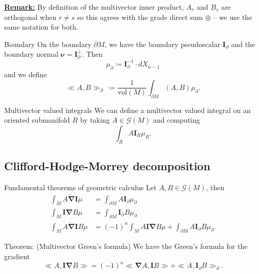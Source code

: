 \documentclass[aspectratio=169,handout]{beamer}
\newcommand{\grad}{\boldsymbol{\nabla}}
\newcommand{\G}{\mathcal{G}}
\newcommand{\blade}[1]{\boldsymbol{#1}}
\newcommand{\multivecinnerproduct}[2]{\ll #1, #2\gg}
\newcommand{\boundary}{{\partial M}}
\newcommand{\pseudoscalar}{\blade{I}}
\begin{document}
\begin{frame}{}
\textbf{\underline{Remark:}} By definition of the multivector inner product, $A_r$ and $B_s$ are orthogonal when $r\neq s$ so this agrees with the grade direct sum $\oplus$ -- we use the same notation for both.
\end{frame}

\begin{frame}{Boundary}
\vfill
On the boundary $\partial M$, we have the boundary pseudoscalar $\pseudoscalar_{\partial}$ and the boundary normal $\blade{\nu} = \pseudoscalar_\partial^\perp$. Then
\[
\mu_\partial \coloneqq \pseudoscalar_\partial^{-1} \cdot dX_{n-1}
\] 
and we define 
\[
\multivecinnerproduct{A}{B}_\partial~ \coloneqq \frac{1}{\textrm{vol}(M)}\int_{\boundary} (A,B)\mu_\partial.
\]
\vfill
\end{frame}

\begin{frame}{Multivector valued integrals}
\vfill
We can define a multivector valued integral on an oriented submanifold $R$ by taking $A\in \G(M)$ and computing
\[
\int_R A \pseudoscalar_R \mu_R.
\]
\vfill
\end{frame}


\subsection{Clifford-Hodge-Morrey decomposition}

\begin{frame}{Fundamental theorems of geometric calculus}
Let $A,B \in \G(M)$, then
\begin{align*}
\int_M \dot{A}\dot{\grad}\pseudoscalar \mu &= \int_\boundary A \pseudoscalar_\partial \mu_\partial\\
\int_M \pseudoscalar \grad B \mu &= \int_\boundary \pseudoscalar_\partial B\mu_\partial\\
\int_M \dot{A}\dot{\grad} \pseudoscalar B \mu &= (-1)^n \int_M A \pseudoscalar \grad B \mu + \int_\boundary A \pseudoscalar_\partial B \mu_\partial.
\end{align*}
\end{frame}

\begin{frame}{Theorem: (Multivector Green's formula)}
We have the Green's formula for the gradient
\[
\multivecinnerproduct{A}{\pseudoscalar \grad B} = (-1)^n \multivecinnerproduct{\grad A}{\pseudoscalar B} + \multivecinnerproduct{A}{\pseudoscalar_\partial B}_\partial.
\]
\end{frame}
\end{document}
